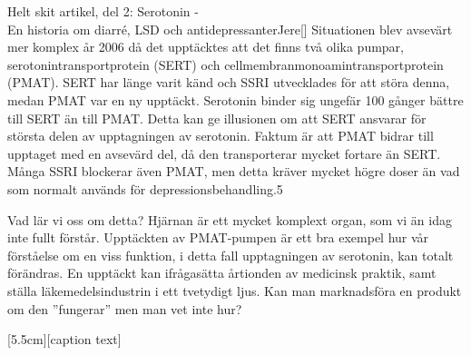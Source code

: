 \documentclass{spektraklet}
\begin{document}
\begin{artikel}{Helt skit artikel, del 2: Serotonin - \\ En historia om diarré, LSD och antidepressanter}{Jere}[]
Situationen blev avsevärt mer komplex år 2006 då det upptäcktes att det finns två olika pumpar, serotonintransportprotein (SERT) och cellmembranmonoamintransportprotein (PMAT). SERT har länge varit känd och SSRI utvecklades för att störa denna, medan PMAT var en ny upptäckt. Serotonin binder sig ungefär 100 gånger bättre till SERT än till PMAT. Detta kan ge illusionen om att SERT ansvarar för största delen av upptagningen av serotonin. Faktum är att PMAT bidrar till upptaget med en avsevärd del, då den transporterar mycket fortare än SERT. Många SSRI blockerar även PMAT, men detta kräver mycket högre doser än vad som normalt används för depressionsbehandling.5

Vad lär vi oss om detta? Hjärnan är ett mycket komplext organ, som vi än idag inte fullt förstår. Upptäckten av PMAT-pumpen är ett bra exempel hur vår förståelse om en viss funktion, i detta fall upptagningen av serotonin, kan totalt förändras. En upptäckt kan ifrågasätta årtionden av medicinsk praktik, samt ställa läkemedelsindustrin i ett tvetydigt ljus. Kan man marknadsföra en produkt om den ''fungerar'' men man vet inte hur?

\end{artikel}



[5.5cm][caption text]
\newpage
\end{document}
